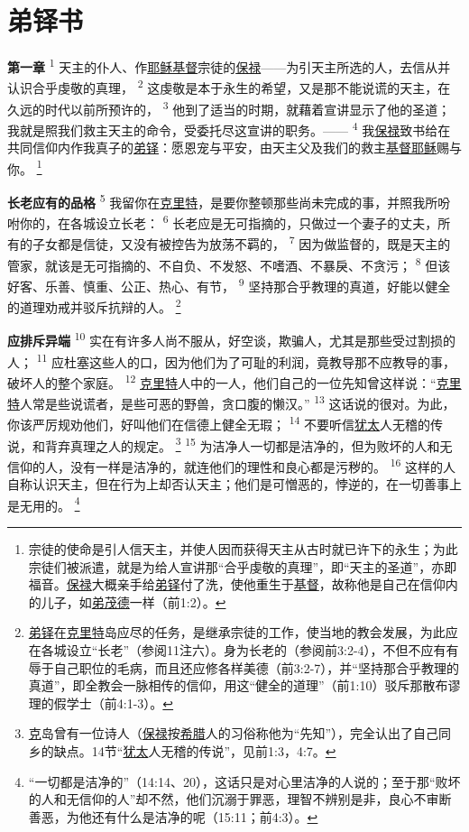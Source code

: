 \chapter*{弟铎书}


\textbf{第一章\quad}
\textsuperscript{1}
天主的仆人、作\uline{耶稣}\uline{基督}宗徒的\uline{保禄}——为引天主所选的人，去信从并认识合乎虔敬的真理，
\textsuperscript{2}
这虔敬是本于永生的希望，又是那不能说谎的天主，在久远的时代以前所预许的，
\textsuperscript{3}
他到了适当的时期，就藉着宣讲显示了他的圣道；我就是照我们救主天主的命令，受委托尽这宣讲的职务。——
\textsuperscript{4}
我\uline{保禄}致书给在共同信仰内作我真子的\uline{弟铎}：愿恩宠与平安，由天主父及我们的救主\uline{基督}\uline{耶稣}赐与你。
\renewcommand\thefootnote{\ding{\numexpr171+\value{footnote}}}
\footnote{宗徒的使命是引人信天主，并使人因而获得天主从古时就已许下的永生；为此宗徒们被派遣，就是为给人宣讲那“合乎虔敬的真理”，即“天主的圣道”，亦即福音。\uline{保禄}大概亲手给\uline{弟铎}付了洗，使他重生于\uline{基督}，故称他是自己在信仰内的儿子，如\uline{弟茂德}一样（前1:2）。}

\textbf{长老应有的品格\quad}
\textsuperscript{5}
我留你在\uline{克里特}，是要你整顿那些尚未完成的事，并照我所吩咐你的，在各城设立长老：
\textsuperscript{6}
长老应是无可指摘的，只做过一个妻子的丈夫，所有的子女都是信徒，又没有被控告为放荡不羁的，
\textsuperscript{7}
因为做监督的，既是天主的管家，就该是无可指摘的、不自负、不发怒、不嗜酒、不暴戾、不贪污；
\textsuperscript{8}
但该好客、乐善、慎重、公正、热心、有节，
\textsuperscript{9}
坚持那合乎教理的真道，好能以健全的道理劝戒并驳斥抗辩的人。
\footnote{\uline{弟铎}在\uline{克里特}岛应尽的任务，是继承宗徒的工作，使当地的教会发展，为此应在各城设立“长老”（参阅11注六）。身为长老的（参阅前3:2-4），不但不应有有辱于自己职位的毛病，而且还应修各样美德（前3:2-7），并“坚持那合乎教理的真道”，即全教会一脉相传的信仰，用这“健全的道理”（前1:10）驳斥那散布谬理的假学士（前4:1-3）。}

\textbf{应排斥异端\quad}
\textsuperscript{10}
实在有许多人尚不服从，好空谈，欺骗人，尤其是那些受过割损的人；
\textsuperscript{11}
应杜塞这些人的口，因为他们为了可耻的利润，竟教导那不应教导的事，破坏人的整个家庭。
\textsuperscript{12}
\uline{克里特}人中的一人，他们自己的一位先知曾这样说：“\uline{克里特}人常是些说谎者，是些可恶的野兽，贪口腹的懒汉。”
\textsuperscript{13}
这话说的很对。为此，你该严厉规劝他们，好叫他们在信德上健全无瑕；
\textsuperscript{14}
不要听信\uline{犹太}人无稽的传说，和背弃真理之人的规定。
\footnote{\uline{克}岛曾有一位诗人（\uline{保禄}按\uline{希腊}人的习俗称他为“先知”），完全认出了自己同乡的缺点。14节“\uline{犹太}人无稽的传说”，见前1:3，4:7。}
\textsuperscript{15}
为洁净人一切都是洁净的，但为败坏的人和无信仰的人，没有一样是洁净的，就连他们的理性和良心都是污秽的。
\textsuperscript{16}
这样的人自称认识天主，但在行为上却否认天主；他们是可憎恶的，悖逆的，在一切善事上是无用的。
\footnote{“一切都是洁净的”（14:14、20），这话只是对心里洁净的人说的；至于那“败坏的人和无信仰的人”却不然，他们沉溺于罪恶，理智不辨别是非，良心不审断善恶，为他还有什么是洁净的呢（15:11；前4:3）。}

